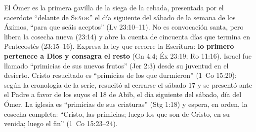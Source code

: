 \documentclass[11pt,letterpaper]{article}
\newcommand{\SENOR}{\textsc{Señor}}
\newcommand{\destacar}[1]{\textbf{\textcolor{tierraroja}{#1}}}
\begin{document}
\begin{tcolorbox}[enhanced,unbreakable,colback=papiro,colframe=tierraroja,boxrule=1pt,arc=3pt,title={\bfseries El Ómer de las primicias},coltitle=papiro,colbacktitle=tierraroja]
El Ómer es la primera gavilla de la siega de la cebada, presentada por el sacerdote ``delante de \SENOR{}'' el día siguiente del sábado de la semana de los Ázimos, ``para que seáis aceptos'' (Lv 23:10--11). No es convocación santa, pero libera la cosecha nueva (23:14) y abre la cuenta de cincuenta días que termina en Pentecostés (23:15--16). Expresa la ley que recorre la Escritura: \destacar{lo primero pertenece a Dios y consagra el resto} (Gn 4:4; Éx 23:19; Ro 11:16). Israel fue llamado ``primicias de sus nuevos frutos'' (Jer 2:3) desde su juventud en el desierto. Cristo resucitado es ``primicias de los que durmieron'' (1~Co 15:20); según la cronología de la serie, resucitó al cerrarse el sábado 17 y se presentó ante el Padre a favor de los suyos el 18 de Abib, el día siguiente del sábado, día del Ómer. La iglesia es ``primicias de sus criaturas'' (Stg 1:18) y espera, en orden, la cosecha completa: ``Cristo, las primicias; luego los que son de Cristo, en su venida; luego el fin'' (1~Co 15:23--24).
\end{tcolorbox}
\end{document}
